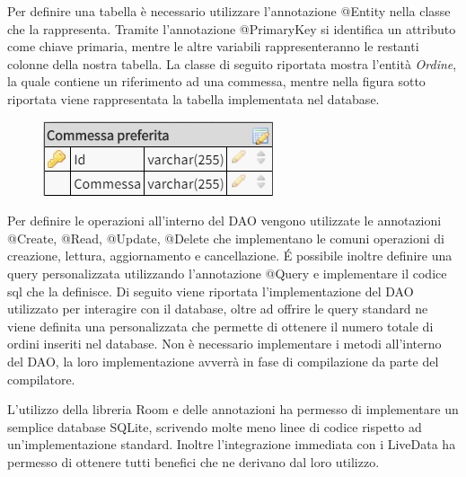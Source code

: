 \documentclass[12pt]{report}
\begin{document}
Per definire una tabella è necessario utilizzare l'annotazione @Entity nella classe che la rappresenta. Tramite l'annotazione @PrimaryKey si identifica un attributo come chiave primaria, mentre le altre variabili rappresenteranno le restanti colonne della nostra tabella.
La classe di seguito riportata mostra l'entità \textit{Ordine}, la quale contiene un riferimento ad una commessa, mentre nella figura sotto riportata viene rappresentata la tabella implementata nel database.
\begin{figure}[h!]
	\centering
	\includegraphics[width=0.3\linewidth]{immagini/db}
	\caption{}
	\label{fig:tabella_commessa}
\end{figure}

Per definire le operazioni all'interno del DAO vengono utilizzate le annotazioni @Create, @Read, @Update, @Delete che implementano le comuni operazioni di creazione, lettura, aggiornamento e cancellazione. É possibile inoltre definire una query personalizzata utilizzando l'annotazione @Query e implementare il codice sql che la definisce. Di seguito viene riportata l'implementazione del DAO utilizzato per interagire con il database, oltre ad offrire le query standard ne viene definita una personalizzata che permette di ottenere il numero totale di ordini inseriti nel database. Non è necessario implementare i metodi all'interno del DAO, la loro implementazione avverrà in fase di compilazione da parte del compilatore.

L'utilizzo della libreria Room e delle annotazioni ha permesso di implementare un semplice database SQLite, scrivendo molte meno linee di codice rispetto ad un'implementazione standard. Inoltre l'integrazione immediata con i LiveData ha permesso di ottenere tutti benefici che ne derivano dal loro utilizzo.
\end{document}
